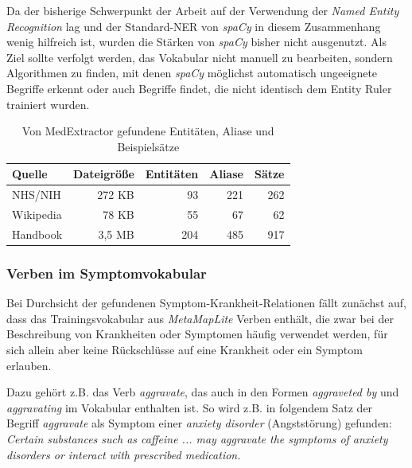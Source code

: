 Da der bisherige Schwerpunkt der Arbeit auf der Verwendung der \emph{Named Entity Recognition} lag und der Standard-NER von \emph{spaCy} in diesem Zusammenhang wenig hilfreich ist, wurden die Stärken von \emph{spaCy} bisher nicht ausgenutzt. Als Ziel sollte verfolgt werden, das Vokabular nicht manuell zu bearbeiten, sondern Algorithmen zu finden, mit denen \emph{spaCy} möglichst automatisch ungeeignete Begriffe erkennt oder auch Begriffe findet, die nicht identisch dem Entity Ruler trainiert wurden.

\begin{table}
\begin{center}
\begin{tabular}{lrrrr}
\hline
\textbf{Quelle}	& \textbf{Dateigröße}	& \textbf{Entitäten} & \textbf{Aliase} & \textbf{Sätze} \\
\hline
NHS/NIH &	272 KB & 93 & 221 & 262 \\
Wikipedia & 78 KB & 55 & 67  & 62 \\
Handbook & 3,5 MB & 204 & 485  & 917 \\
\hline
\end{tabular}
\caption{Von MedExtractor gefundene Entitäten, Aliase und Beispielsätze}
\label{tab:zaehlung}
\end{center}
\end{table}

\subsubsection{Verben im Symptomvokabular}
\label{subsec: verben} 

Bei Durchsicht der gefundenen Symptom-Krankheit-Relationen fällt zunächst auf, dass das Trainingsvokabular aus \emph{MetaMapLite} Verben enthält, die zwar bei der Beschreibung von Krankheiten oder Symptomen häufig verwendet werden, für sich allein aber keine Rückschlüsse auf eine Krankheit oder ein Symptom erlauben.

Dazu gehört z.B. das Verb \emph{aggravate}, das auch in den Formen \emph{aggraveted by} und \emph{aggravating} im Vokabular enthalten ist. So wird z.B. in folgendem Satz der Begriff \emph{aggravate} als Symptom einer \emph{anxiety disorder} (Angststörung) gefunden:\\

\emph{\glqq Certain substances such as caffeine ... may aggravate the symptoms of anxiety disorders or interact with prescribed medication.\grqq}\\

